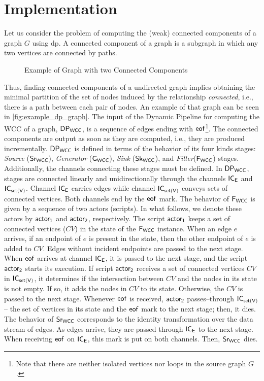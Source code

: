 \section{Implementation}
Let us consider the problem of computing the (weak) connected components of a graph $G$ using \acrshort{dp}. 
A connected component of a graph is a subgraph in which any two vertices are connected by paths. 
\begin{wrapfigure}{r}{0.3\textwidth}
  \begin{center}
\end{center}
\caption[Graph WCC Example]{Example of Graph with two Connected Components}
\label{fig:example_dp_graph}
\end{wrapfigure}
Thus, finding connected components of a undirected graph implies obtaining the minimal partition of the set of nodes induced by the relationship \textit{connected}, i.e., there is a path between each pair of nodes. An example of that graph can be seen in \autoref{fig:example_dp_graph}.
The input of the Dynamic Pipeline for computing the WCC of a graph, $\mathsf{DP_{WCC}}$, is a sequence of edges ending with $\mathsf{eof}$\footnote{Note that there are neither isolated vertices nor loops in the source graph $G$.}. The connected components are output as soon as they are computed, i.e., they are produced incrementally. 
%
$\mathsf{DP_{WCC}}$ is defined in terms of the behavior of its four kinds stages: \textit{Source} ($\mathsf{Sr_{WCC}}$),  \textit{Generator} ($\mathsf{G_{WCC}}$),  \textit{Sink} ($\mathsf{Sk_{WCC}}$), and \textit{Filter}($\mathsf{F_{WCC}}$) stages. Additionally,  the channels connecting these stages must be defined. 
In $\mathsf{DP_{WCC}}$, stages are connected linearly and unidirectionally through the channels $\mathsf{IC_E}$ and  $\mathsf{IC_{set(V)}}$. Channel $\mathsf{IC_E}$ carries edges while channel  $\mathsf{IC_{set(V)}}$ conveys sets of connected vertices. Both channels end by the $\mathsf{eof}$ mark. 
The behavior of $\mathsf{F_{WCC}}$ is given by a sequence of two actors (scripts). In what follows, we denote these actors by $\mathsf{actor_1}$ and $\mathsf{actor_2}$, respectively. 
The script $\mathsf{actor_1}$ keeps a set of connected vertices ($CV$) in the state of the $\mathsf{F_{WCC}}$ instance. When an edge $e$ arrives, if an endpoint of $e$ is present in the state, then the other endpoint of $e$ is added to $CV$. 
Edges without incident endpoints are passed to the next stage. When $\mathsf{eof}$ arrives at channel $\mathsf{IC_E}$, it is passed to the next stage, and the script $\mathsf{actor_2}$ starts its execution. 
If script $\mathsf{actor_2}$ receives a set of connected vertices $CV$ in $\mathsf{IC_{set(V)}}$, it determines if the intersection between $CV$ and the nodes in its state is not empty. If so, it adds the nodes in $CV$  to its state. 
Otherwise, the $CV$ is passed to the next stage.  Whenever $\mathsf{eof}$ is received, $\mathsf{actor_2}$ passes--through $\mathsf{IC_{set(V)}}$-- the set of vertices in its state and the $\mathsf{eof}$ mark to the next stage; then, it dies.
The behavior of $\mathsf{Sr_{WCC}}$ corresponds to the identity transformation over the data stream of edges.  As edges arrive, they are passed through  $\mathsf{IC_E}$ to the next stage. When receiving $\mathsf{eof}$ on $\mathsf{IC_E}$, this mark is put on both channels. 
Then, $\mathsf{Sr_{WCC}}$ dies. 

